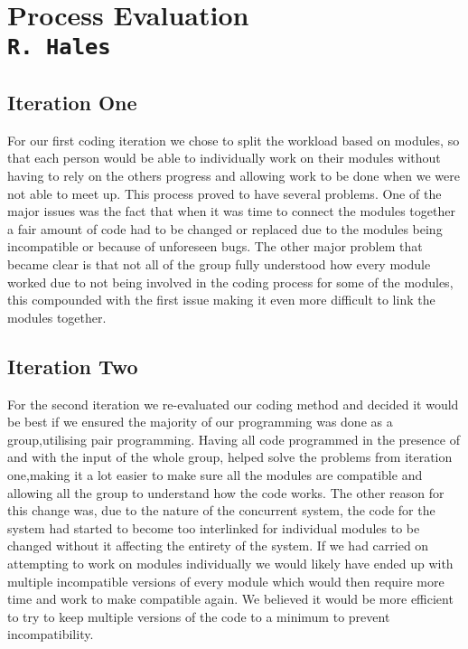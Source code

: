 \pagestyle{empty}

\section{Process Evaluation\\{\small\tt{R.~Hales}}}
\subsection{Iteration One}
For our first coding iteration we chose to split the workload based on modules, so that each person would be able to individually work on their modules without having to rely on the others progress and allowing work to be done when we were not able to meet up. 
This process proved to have several problems. One of the major issues was the fact that when it was time to connect the modules together a fair amount of code had to be changed or replaced due to the modules being incompatible or because of unforeseen bugs. The other major problem that became clear is that not all of the group fully understood how every module worked due to not being involved in the coding process for some of the modules, this compounded with the first issue making it even more difficult to link the modules together.
\subsection{Iteration Two}
For the second iteration we re-evaluated our coding method and decided it would be best if we ensured the majority of our programming was done as a group,utilising pair programming. Having all code programmed  in the presence of and with the input of the whole group, helped solve the problems from iteration one,making it a lot easier to make sure all the modules are compatible and allowing all the group to understand how the code works.
 The other reason for this change was, due to the nature of the concurrent system, the code for the system had started to become too interlinked for individual modules to be changed without it affecting the entirety of the system. If we had carried on attempting to work on modules individually we would likely have ended up with multiple incompatible versions of every module which would then require more time and work to make compatible again. We believed it would be more efficient to try to keep multiple versions of the code to a minimum to prevent incompatibility.
\clearpage
\endinput


